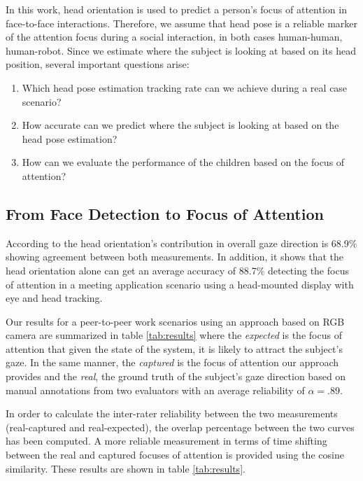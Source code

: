 \documentclass{sig-alternate}
\begin{document}
In this work, head orientation is used to predict a person's focus of attention in face-to-face interactions. Therefore, we assume that head pose is a reliable marker of the attention focus during a social interaction, in both cases human-human, human-robot. Since we estimate where the subject is looking at based on its head position, several important questions arise:

\begin{enumerate}
\item Which head pose estimation tracking rate can we achieve during a real case scenario?  
\item How accurate can we predict where the subject is looking at based on the head pose estimation?
\item How can we evaluate the performance of the children based on the focus of attention?
\end{enumerate}


\subsection{From Face Detection to Focus of Attention}

According to \cite{stiefelhagen2002tracking} the head orientation's contribution in overall gaze direction is 68.9\% showing agreement between both measurements. In addition, it shows that the head orientation alone can get an average accuracy of 88.7\% detecting the focus of attention in a meeting application scenario using a head-mounted display with eye and head tracking.

Our results for a peer-to-peer work scenarios using an approach based on RGB camera are summarized in table \ref{tab:results} where the \textit{expected} is the focus of attention that given the state of the system, it is likely to attract the subject's gaze. In the same manner, the \textit{captured} is the focus of attention our approach provides and the \textit{real}, the ground truth of the subject's gaze direction based on manual annotations from two evaluators with an average reliability of $ \alpha = .89 $.

In order to calculate the inter-rater reliability between the two measurements (real-captured and real-expected), the overlap percentage between the two curves has been computed. A more reliable measurement in terms of time shifting between the real and captured focuses of attention is provided using the cosine similarity. These results are shown in table \ref{tab:results}. 
\end{document}
